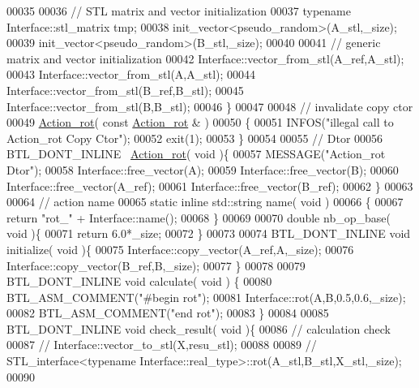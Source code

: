 \begin{DoxyCode}
00035 
00036     \textcolor{comment}{// STL matrix and vector initialization}
00037     \textcolor{keyword}{typename} Interface::stl\_matrix tmp;
00038     init\_vector<pseudo\_random>(A\_stl,\_size);
00039     init\_vector<pseudo\_random>(B\_stl,\_size);
00040 
00041     \textcolor{comment}{// generic matrix and vector initialization}
00042     Interface::vector\_from\_stl(A\_ref,A\_stl);
00043     Interface::vector\_from\_stl(A,A\_stl);
00044     Interface::vector\_from\_stl(B\_ref,B\_stl);
00045     Interface::vector\_from\_stl(B,B\_stl);
00046   \}
00047 
00048   \textcolor{comment}{// invalidate copy ctor}
00049   \hyperlink{class_action__rot}{Action\_rot}( \textcolor{keyword}{const}  \hyperlink{class_action__rot}{Action\_rot} & )
00050   \{
00051     INFOS(\textcolor{stringliteral}{"illegal call to Action\_rot Copy Ctor"});
00052     exit(1);
00053   \}
00054 
00055   \textcolor{comment}{// Dtor}
00056   BTL\_DONT\_INLINE ~\hyperlink{class_action__rot}{Action\_rot}( \textcolor{keywordtype}{void} )\{
00057     MESSAGE(\textcolor{stringliteral}{"Action\_rot Dtor"});
00058     Interface::free\_vector(A);
00059     Interface::free\_vector(B);
00060     Interface::free\_vector(A\_ref);
00061     Interface::free\_vector(B\_ref);
00062   \}
00063 
00064   \textcolor{comment}{// action name}
00065   \textcolor{keyword}{static} \textcolor{keyword}{inline} std::string name( \textcolor{keywordtype}{void} )
00066   \{
00067     \textcolor{keywordflow}{return} \textcolor{stringliteral}{"rot\_"} + Interface::name();
00068   \}
00069 
00070   \textcolor{keywordtype}{double} nb\_op\_base( \textcolor{keywordtype}{void} )\{
00071     \textcolor{keywordflow}{return} 6.0*\_size;
00072   \}
00073 
00074   BTL\_DONT\_INLINE  \textcolor{keywordtype}{void} initialize( \textcolor{keywordtype}{void} )\{
00075     Interface::copy\_vector(A\_ref,A,\_size);
00076     Interface::copy\_vector(B\_ref,B,\_size);
00077   \}
00078 
00079   BTL\_DONT\_INLINE \textcolor{keywordtype}{void} calculate( \textcolor{keywordtype}{void} ) \{
00080     BTL\_ASM\_COMMENT(\textcolor{stringliteral}{"#begin rot"});
00081     Interface::rot(A,B,0.5,0.6,\_size);
00082     BTL\_ASM\_COMMENT(\textcolor{stringliteral}{"end rot"});
00083   \}
00084 
00085   BTL\_DONT\_INLINE \textcolor{keywordtype}{void} check\_result( \textcolor{keywordtype}{void} )\{
00086     \textcolor{comment}{// calculation check}
00087 \textcolor{comment}{//     Interface::vector\_to\_stl(X,resu\_stl);}
00088 
00089 \textcolor{comment}{//     STL\_interface<typename Interface::real\_type>::rot(A\_stl,B\_stl,X\_stl,\_size);}
00090 

\end{DoxyCode}

